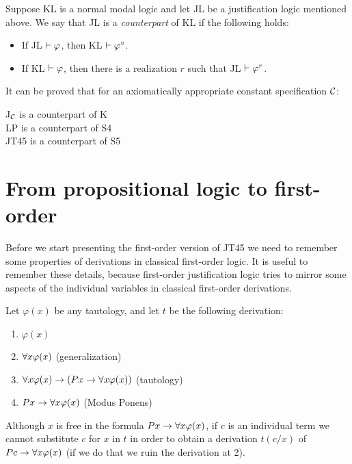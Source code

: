\begin{defn}
Suppose KL is a normal modal logic and let JL be a justification logic mentioned above. We say that JL is a \textit{counterpart} of KL if the following holds:

\begin{itemize}
\item  If JL $\vdash \varphi$, then KL $\vdash \varphi^{\circ}$.
\item  If KL $\vdash \varphi$, then there is a realization $r$ such that JL $\vdash \varphi^{r}$.
\end{itemize}
\end{defn}


\qquad It can be proved that for an axiomatically appropriate constant specification $\mathcal{C}$:

\begin{center}
J$_{\mathcal{C}}$ is a counterpart of K\\

LP is a counterpart of S4\\

JT45 is a counterpart of S5
\end{center}

 


\section{From propositional logic to first-order}

\qquad Before we start presenting the first-order version of JT45 we need to remember some properties of derivations in classical first-order logic. It is useful to remember these details, because first-order justification logic tries to mirror some aspects of the individual variables in classical first-order derivations.     

\qquad Let $\varphi(x)$ be any tautology, and let $t$ be the following derivation:

\begin{enumerate}[1.]
	\item $\varphi(x)$ 
	\item $\forall x \varphi(x)$                 (generalization)
	\item $\forall x\varphi(x) \rightarrow (Px \rightarrow \forall x\varphi(x))$ (tautology)
	\item $Px \rightarrow \forall x\varphi(x)$ (Modus Ponens)
\end{enumerate}

\qquad Although $x$ is free in the formula $Px \rightarrow \forall x\varphi(x)$, if $c$ is an individual term we cannot substitute $c$ for $x$ in $t$ in order to obtain a derivation $t(c / x)$ of $Pc \rightarrow \forall x\varphi(x)$ (if we do that we ruin the derivation at 2).
	
